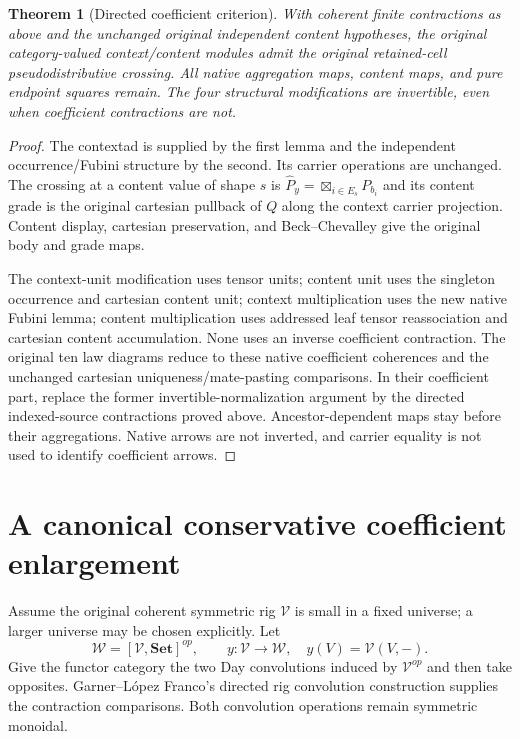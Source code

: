 \documentclass[11pt]{article}
\newtheorem{theorem}{Theorem}
\newcommand{\V}{\mathcal V}
\newcommand{\W}{\mathcal W}
\begin{document}
\begin{theorem}[Directed coefficient criterion]
With coherent finite contractions as above and the unchanged original independent content hypotheses, the original category-valued context/content modules admit the original retained-cell pseudodistributive crossing. All native aggregation maps, content maps, and pure endpoint squares remain. The four structural modifications are invertible, even when coefficient contractions are not.
\end{theorem}
\begin{proof}
The contextad is supplied by the first lemma and the independent occurrence/Fubini structure by the second. Its carrier operations are unchanged. The crossing at a content value of shape $s$ is $\widehat P_y=\boxtimes_{i\in E_s}P_{b_i}$ and its content grade is the original cartesian pullback of $Q$ along the context carrier projection. Content display, cartesian preservation, and Beck--Chevalley give the original body and grade maps.

The context-unit modification uses tensor units; content unit uses the singleton occurrence and cartesian content unit; context multiplication uses the new native Fubini lemma; content multiplication uses addressed leaf tensor reassociation and cartesian content accumulation. None uses an inverse coefficient contraction. The original ten law diagrams reduce to these native coefficient coherences and the unchanged cartesian uniqueness/mate-pasting comparisons. In their coefficient part, replace the former invertible-normalization argument by the directed indexed-source contractions proved above. Ancestor-dependent maps stay before their aggregations. Native arrows are not inverted, and carrier equality is not used to identify coefficient arrows.
\end{proof}

\section{A canonical conservative coefficient enlargement}
Assume the original coherent symmetric rig $\V$ is small in a fixed universe; a larger universe may be chosen explicitly. Let
\[
 \W=[\V,\mathbf{Set}]^{op},\qquad y:\V\longrightarrow\W,
 \quad y(V)=\V(V,-).
\]
Give the functor category the two Day convolutions induced by $\V^{op}$ and then take opposites. Garner--L\'opez Franco's directed rig convolution construction supplies the contraction comparisons. Both convolution operations remain symmetric monoidal.
\end{document}
